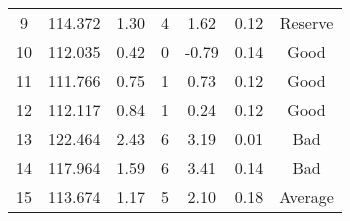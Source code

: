 \documentclass[12pt]{article}
\begin{document}
\begin{table}[t]
\begin{tabular}{ccccccc}
9       & 114.372 &  1.30    & 4            &   1.62    &    0.12       &  Reserve \\    \rowcolor{TealBlue}             %
10      & 112.035 &  0.42    & 0            &  -0.79    &    0.14       &  Good    \\    \rowcolor{TealBlue}             %
11      & 111.766 &  0.75    & 1            &   0.73    &    0.12       &  Good    \\    \rowcolor{TealBlue}             %
12      & 112.117 &  0.84    & 1            &   0.24    &    0.12       &  Good    \\    \rowcolor{Salmon}             %
13      & 122.464 &  2.43    & 6            &   3.19    &    0.01       &  Bad     \\    \rowcolor{Salmon}             %
14      & 117.964 &  1.59    & 6            &   3.41    &    0.14       &  Bad     \\    \rowcolor{GreenYellow}             %
15      & 113.674 &  1.17    & 5            &   2.10    &    0.18       &  Average \\    
\bottomrule
\end{tabular}
\label{table_master}
\end{table}
\end{document}
